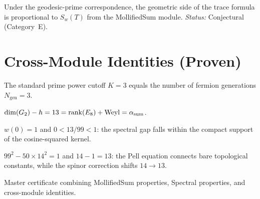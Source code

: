 \begin{theorem}\label{thm:geometric_matches}
    Under the geodesic-prime correspondence, the geometric side of the trace
    formula is proportional to $S_w(T)$ from the MollifiedSum module.
    \emph{Status:} Conjectural (Category~E).
\end{theorem}

\section{Cross-Module Identities (Proven)}

\begin{theorem}[K\_max = N\_gen]\label{thm:kmax_N_gen}
    \leanok
    The standard prime power cutoff $K = 3$ equals the number of fermion
    generations $N_{\mathrm{gen}} = 3$.
\end{theorem}

\begin{theorem}[Spectral Product = Anomaly Sum]\label{thm:spectral_alpha}
    \leanok
    $\mathrm{dim}(G_2) - h = 13 = \mathrm{rank}(E_8) + \text{Weyl} = \alpha_{\mathrm{sum}}$.
\end{theorem}

\begin{theorem}\label{thm:gap_in_support}
    \leanok
    $w(0) = 1$ and $0 < 13/99 < 1$: the spectral gap falls within the
    compact support of the cosine-squared kernel.
\end{theorem}

\begin{theorem}\label{thm:pell_bridge}
    \leanok
    $99^2 - 50 \times 14^2 = 1$ and $14 - 1 = 13$: the Pell equation connects
    bare topological constants, while the spinor correction shifts $14 \to 13$.
\end{theorem}

\begin{theorem}\label{thm:selberg_bridge_cert}
    \leanok
    Master certificate combining MollifiedSum properties, Spectral properties,
    and cross-module identities.
\end{theorem}

